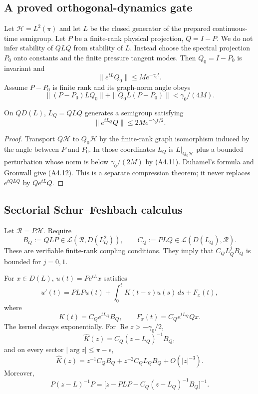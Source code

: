 \subsection{A proved orthogonal-dynamics gate}

Let $\mathcal H=L^2(\pi)$ and let $L$ be the closed generator of the prepared
continuous-time semigroup.  Let $P$ be a finite-rank physical projection,
$Q=I-P$.  We do not infer stability of $QLQ$ from stability of $L$.
Instead choose the spectral projection $P_0$ onto constants and the finite
pressure tangent modes.  Then $Q_0=I-P_0$ is invariant and
\[
 \|e^{tL}Q_0\|\le Me^{-\gamma_0t}.                        \tag{A4.10}
\]
Assume $P-P_0$ is finite rank and its graph-norm angle obeys
\[
 \|(P-P_0)LQ_0\|+\|Q_0L(P-P_0)\|<\gamma_0/(4M).           \tag{A4.11}
\]

\begin{lemma}
\label{lem:r27-a4-compression}
On $QD(L)$, $L_Q=QLQ$ generates a semigroup satisfying
\[
 \|e^{tL_Q}Q\|\le2M e^{-\gamma_0t/2}.                     \tag{A4.12}
\]
\end{lemma}

\begin{proof}
Transport $Q\mathcal H$ to $Q_0\mathcal H$ by the finite-rank graph
isomorphism induced by the angle between $P$ and $P_0$.  In those coordinates
$L_Q$ is $L|_{Q_0\mathcal H}$ plus a bounded perturbation whose norm is below
$\gamma_0/(2M)$ by (A4.11).  Duhamel's formula and Gronwall give (A4.12).
This is a separate compression theorem; it never replaces
$e^{tQLQ}$ by $Qe^{tL}Q$.
\end{proof}

\subsection{Sectorial Schur--Feshbach calculus}

Let $\mathcal R=P\mathcal H$.  Require
\[
 B_Q:=QLP\in\mathcal L(\mathcal R,D(L_Q^2)),\qquad
 C_Q:=PLQ\in\mathcal L(D(L_Q),\mathcal R).                \tag{A4.13}
\]
These are verifiable finite-rank coupling conditions.  They imply that
$C_QL_Q^jB_Q$ is bounded for $j=0,1$.

\begin{theorem}
\label{thm:r27-a4-memory}
For $x\in D(L)$, $u(t)=Pe^{tL}x$ satisfies
\[
 u'(t)=PLPu(t)+\int_0^tK(t-s)u(s)\,ds+F_x(t),             \tag{A4.14}
\]
where
\[
 K(t)=C_Qe^{tL_Q}B_Q,\qquad
 F_x(t)=C_Qe^{tL_Q}Qx.                                   \tag{A4.15}
\]
The kernel decays exponentially.  For
$\operatorname{Re}z>-\gamma_0/2$,
\[
 \widehat K(z)=C_Q(z-L_Q)^{-1}B_Q,                        \tag{A4.16}
\]
and on every sector $|\arg z|\le\pi-\epsilon$,
\[
 \widehat K(z)
 =z^{-1}C_QB_Q+z^{-2}C_QL_QB_Q+O(|z|^{-3}).              \tag{A4.17}
\]
Moreover,
\[
 P(z-L)^{-1}P
 =\bigl[z-PLP-C_Q(z-L_Q)^{-1}B_Q\bigr]^{-1}.              \tag{A4.18}
\]
\end{theorem}

